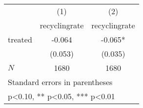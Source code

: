 {
\def\sym#1{\ifmmode^{#1}\else\(^{#1}\)\fi}
\begin{tabular}{l*{2}{c}}
\hline\hline
            &\multicolumn{1}{c}{(1)}&\multicolumn{1}{c}{(2)}\\
            &\multicolumn{1}{c}{recyclingrate}&\multicolumn{1}{c}{recyclingrate}\\
\hline
treated     &      -0.064   &      -0.065*  \\
            &     (0.053)   &     (0.035)   \\
\hline
\(N\)       &        1680   &        1680   \\
\hline\hline
\multicolumn{3}{l}{\footnotesize Standard errors in parentheses}\\
\multicolumn{3}{l}{\footnotesize * p<0.10, ** p<0.05, *** p<0.01}\\
\end{tabular}
}
